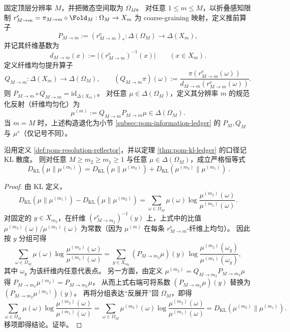 \begin{definition}\label{def:pom-resolution-reflector}
固定顶层分辨率 $M$，并把微态空间取为 $\Omega_M$。
对任意 $1\le m\le M$，以折叠感知限制
\(
r^{\mathrm{e}}_{M\to m}=\pi_{M\to m}\circ \Fold_M:\Omega_M\to X_m
\)
为 coarse-graining 映射，定义推前算子
\[
P_{M\to m}:=(r^{\mathrm{e}}_{M\to m})_*:\Delta(\Omega_M)\to\Delta(X_m),
\]
并记其纤维基数为
\[
d_{M\to m}(x):=\bigl|(r^{\mathrm{e}}_{M\to m})^{-1}(x)\bigr|\qquad(x\in X_m).
\]
定义纤维均匀提升算子
\[
Q_{M\to m}:\Delta(X_m)\to\Delta(\Omega_M),
\qquad
(Q_{M\to m}\pi)(\omega):=\frac{\pi(r^{\mathrm{e}}_{M\to m}(\omega))}{d_{M\to m}(r^{\mathrm{e}}_{M\to m}(\omega))}.
\]
则 $P_{M\to m}\circ Q_{M\to m}=\mathrm{id}_{\Delta(X_m)}$。
对任意 $\mu\in\Delta(\Omega_M)$，定义其分辨率 $m$ 的规范化反射（纤维均匀化）为
\[
\mu^{(m)}:=Q_{M\to m}P_{M\to m}\mu\in\Delta(\Omega_M).
\]
当 $m=M$ 时，上述构造退化为小节 \ref{subsec:pom-information-ledger} 的 $P_M,Q_M$ 与 $\mu^{e}$（仅记号不同）。
\end{definition}

\begin{theorem}\label{thm:pom-kl-pythagoras-tower}
沿用定义 \ref{def:pom-resolution-reflector}，并以定理 \ref{thm:pom-kl-ledger} 的口径记 KL 散度。
则对任意 $M\ge m_2\ge m_1\ge 1$ 与任意 $\mu\in\Delta(\Omega_M)$，成立严格恒等式
\[
\boxed{\;
D_{\mathrm{KL}}(\mu\|\mu^{(m_1)})
=D_{\mathrm{KL}}(\mu\|\mu^{(m_2)})
+D_{\mathrm{KL}}(\mu^{(m_2)}\|\mu^{(m_1)})\; }.
\]
\end{theorem}
\begin{proof}
由 KL 定义，
\[
D_{\mathrm{KL}}(\mu\|\mu^{(m_1)})-D_{\mathrm{KL}}(\mu\|\mu^{(m_2)})
=\sum_{\omega\in\Omega_M}\mu(\omega)\log\frac{\mu^{(m_2)}(\omega)}{\mu^{(m_1)}(\omega)}.
\]
对固定的 $y\in X_{m_2}$，在纤维 $(r^{\mathrm{e}}_{M\to m_2})^{-1}(y)$ 上，上式中的比值
\(
\mu^{(m_2)}(\omega)/\mu^{(m_1)}(\omega)
\)
为常数（因为 $\mu^{(m)}$ 在每条 $r^{\mathrm{e}}_{M\to m}$-纤维上均匀）。
因此按 $y$ 分组可得
\[
\sum_{\omega\in\Omega_M}\mu(\omega)\log\frac{\mu^{(m_2)}(\omega)}{\mu^{(m_1)}(\omega)}
=\sum_{y\in X_{m_2}}(P_{M\to m_2}\mu)(y)\,
\log\frac{\mu^{(m_2)}(\omega_y)}{\mu^{(m_1)}(\omega_y)},
\]
其中 $\omega_y$ 为该纤维内任意代表点。
另一方面，由定义 \(\mu^{(m_2)}=Q_{M\to m_2}P_{M\to m_2}\mu\) 得
\(
P_{M\to m_2}\mu^{(m_2)}=P_{M\to m_2}\mu
\)，
从而上式右端可将系数 $(P_{M\to m_2}\mu)(y)$ 替换为 $(P_{M\to m_2}\mu^{(m_2)})(y)$。
再将分组表达“反展开”回 $\Omega_M$，即得
\[
\sum_{\omega\in\Omega_M}\mu(\omega)\log\frac{\mu^{(m_2)}(\omega)}{\mu^{(m_1)}(\omega)}
=\sum_{\omega\in\Omega_M}\mu^{(m_2)}(\omega)\log\frac{\mu^{(m_2)}(\omega)}{\mu^{(m_1)}(\omega)}
=D_{\mathrm{KL}}(\mu^{(m_2)}\|\mu^{(m_1)}).
\]
移项即得结论。证毕。
\end{proof}

